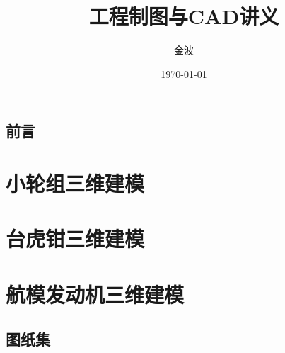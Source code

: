\documentclass[a4paper,twoside]{book}
\begin{document}

\title{\Huge 工程制图与CAD讲义}
\author{\Large 金波}
\date{\today}
\maketitle
\CJKtilde
\frontmatter
\tableofcontents
\chapter*{前言}
\mainmatter
\graphicspath{{pdf/}{png/}}
\part{小轮组三维建模}






\part{台虎钳三维建模}








\part{航模发动机三维建模}









\backmatter
\appendix
\chapter{图纸集}
\printindex
\end{document}

